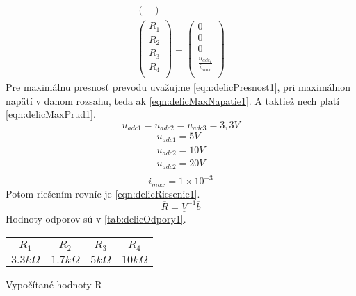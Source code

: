 \begin{multicols*}{2}
\begin{equation}
\begin{split}
\begin{pmatrix}
					\end{pmatrix} \\  
					\begin{pmatrix}
					R_1 \\
					R_2 \\
					R_3 \\
					R_4  \\
					\end{pmatrix} =
					\begin{pmatrix}
					0 \\
					0 \\
					0 \\
					\frac{u_{adc_1}}{i_{max}}  \\
				\end{pmatrix}
			\end{split}
			\label{eqn:delicMatica2}
		\end{equation}
		Pre maximálnu presnosť prevodu uvažujme \cref{eqn:delicPresnost1}, pri maximálnon napätí v danom rozsahu, teda ak \cref{eqn:delicMaxNapatie1}. A taktiež nech platí \cref{eqn:delicMaxPrud1}. 
	\begin{equation}
		u_{adc1} = u_{adc2} = u_{adc3} = 3,3V \label{eqn:delicPresnost1}
	\end{equation}
	\begin{equation}
	\begin{split}
		u_{adc1} = 5 V\\
		u_{adc2} = 10 V \\
		u_{adc2} = 20 V\\ \label{eqn:delicMaxNapatie1}
	\end{split}
	\end{equation}
	\begin{equation}
	i_{max} = 1\times 10 ^{-3} \label{eqn:delicMaxPrud1}
	\end{equation}
 Potom riešením rovníc je \cref{eqn:delicRiesenie1}.
		 \begin{equation}
		 \overline{R} = \underline{V}^{-1}\overline{b} \label{eqn:delicRiesenie1}
		 \end{equation}
		 Hodnoty odporov sú v \cref{tab:delicOdpory1}.
		 \vskip 0.05cm
		 \begin{tablehere}
		 	\centering
		 	\begin{tabular}{cccc}
		 		$R_1$ & $R_2$ & $R_3$ & $R_4$ \\
		 		\hline
		 		$3.3k\Omega$ & $1.7k\Omega$ & $5k\Omega$ & $10k\Omega$ \\
		 	\end{tabular}
	 		\caption{Vypočítané hodnoty R} \label{tab:delicOdpory1}

\end{tablehere}
\end{multicols*}
